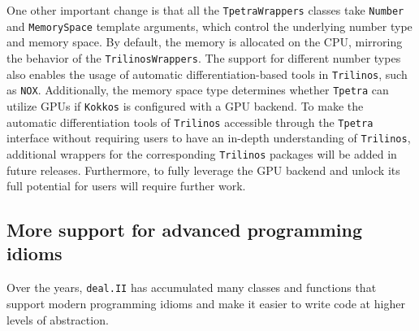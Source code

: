\documentclass{ansarticle-preprint}
\newcommand{\specialword}[1]{\texttt{#1}}
\newcommand{\dealii}{{\specialword{deal.II}}\xspace}
\newcommand{\trilinos}{{\specialword{Trilinos}}\xspace}
\newcommand{\kokkos}{{\specialword{Kokkos}}\xspace}
\newcommand{\tpetra}{{\specialword{Tpetra}}\xspace}
\begin{document}
One other important change is that
all the \texttt{TpetraWrappers} classes take \texttt{Number} and \texttt{MemorySpace} template arguments,
which control the underlying number type and memory space.
By default, the memory is allocated on the CPU, mirroring the behavior of the \texttt{TrilinosWrappers}.
The support for different number types also enables the usage of automatic differentiation-based tools in
\trilinos{}, such as \texttt{NOX}.
Additionally, the memory space type determines whether \tpetra{} can utilize GPUs if \kokkos{} is configured
with a GPU backend.
To make the automatic differentiation tools of \trilinos{} accessible through the \tpetra{} interface without
requiring users to have an in-depth understanding of \trilinos{}, additional wrappers for the corresponding
\trilinos{} packages will be added in future releases.
Furthermore, to fully leverage the GPU backend and unlock its full potential for users will require further work.

\subsection{More support for advanced programming idioms}\label{sec:tools}

Over the years, \dealii{} has accumulated many classes and functions
that support modern programming idioms and make it easier to write
code at higher levels of abstraction.
\end{document}
